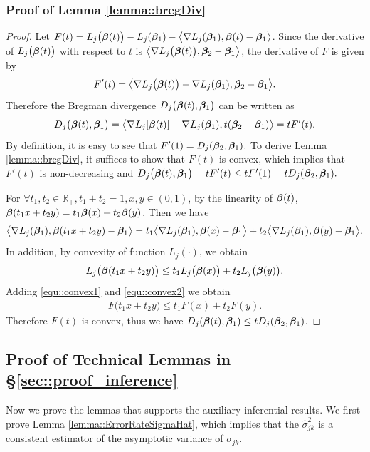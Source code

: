 \documentclass[twoside,11pt]{article}
\newcommand*{\BR}{\mathbb{R}}
\newcommand*{\la}{\langle}
\newcommand*{\ra}{\rangle}
\begin{document}
 \subsubsection{Proof of Lemma \ref{lemma::bregDiv}}\label{proof::lemma::bregDiv}
\begin{proof} 
Let $F(t)  =  L_j\bigl(\bbeta(t)\bigr) -  L_j(\bbeta_1) - \bigl\la\nabla L_j(\bbeta_1) , \bbeta(t) - \bbeta_1\bigr\ra$. Since the derivative of $L_j\bigl(\bm{\beta}(t)\bigr)$ with respect to $t$ is $\bigl\la\nabla  L_j\bigl(\bbeta(t)\bigr), \bbeta_2 - \bbeta_1\bigr\ra$,  the derivative of $F$ is given by
\begin{align*}
F'(t)  =\bigl\la\nabla  L_j\bigl(\bbeta(t)\bigr) - \nabla L_j(\bbeta_1), \bbeta_2 - \bbeta_1\bigr\ra .
\end{align*}
Therefore the Bregman divergence $D_j\bigl(\bm{\beta}(t),\bm{\beta}_1\bigr)$ can be written as
$$
  D_j\bigl(\bbeta(t) , \bbeta_1\bigr)= \bigl\la\nabla  L_j[\bbeta(t)] - \nabla L_j(\bbeta_1), t(\bbeta_2 - \bbeta_1)\bigr\ra =t F'(t) .
$$
By definition, it is easy to see that $F'(1) = D_j(\bm{\beta}_2,\bm{\beta}_1). $ To derive Lemma \ref{lemma::bregDiv}, it suffices to  show that $F(t)$ is convex, which implies that  $F'(t)$ is non-decreasing and   $D_j\bigl(\bm{\beta}(t) ,\bm{\beta}_1\bigr) = tF'(t) \leq tF'(1) = tD_j(\bm{\beta}_2,\bm{\beta}_1).$

For $\forall t_1,t_2\in \BR_+, t_1 + t_2 = 1,x,y\in (0,1)$, by the linearity of $\bm{\beta}(t)$, $\bm{\beta}( t_1 x + t_2 y) = t_1 \bm{\beta}(x)  + t_2  \bm{\beta}(y)$.  Then we have 
\begin{align}\label{equ::convex1}
\bigl\la\nabla L_j(\bbeta_1) , \bbeta(t_1 x + t_2 y) - \bbeta_1\bigr\ra = t_1 \bigl\la\nabla L_j(\bbeta_1) , \bbeta(x) - \bbeta_1\bigr\ra + t_2 \bigl\la\nabla L_j(\bbeta_1) , \bbeta(y) - \bbeta_1\bigr\ra. 
\end{align}
In addition, by convexity of function $L_j(\cdot)$, we obtain
\begin{align}\label{equ::convex2}
L_j\bigl ( \bm{\beta}( t_1 x + t_2 y) \bigr) \leq t_1 L_j \bigl (\bm{\beta}(x)\bigr) + t_2 L_j \bigl (\bm{\beta}(y)\bigr).
\end{align}
Adding  \eqref{equ::convex1} and \eqref{equ::convex2} we obtain  
\begin{align*}
F\bigl(t_1 x + t_2 y \bigr) \leq t_1 F(x)  + t_2 F(y).
\end{align*}
Therefore $F(t)$ is convex, thus we have $D_j(\bm{\beta}(t), \bm{\beta}_1) \leq t D_j(\bm{\beta}_2,\bm{\beta}_1)$. 
\end{proof}

\subsection{Proof of Technical Lemmas in \S \ref{sec::proof_inference}}
Now we prove the lemmas that supports  the auxiliary inferential results.  We first prove Lemma \ref{lemma::ErrorRateSigmaHat}, which implies that the $\hat \sigma_{jk}^2$ is a consistent estimator of the asymptotic variance of $\sigma_{jk}$.
\end{document}
